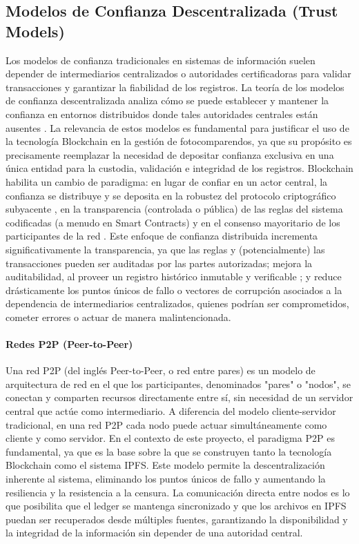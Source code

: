 \subsection{Modelos de Confianza Descentralizada (Trust Models)} 
Los modelos de confianza tradicionales en sistemas de información suelen depender de intermediarios centralizados o autoridades certificadoras para validar transacciones y garantizar la fiabilidad de los registros. La teoría de los modelos de confianza descentralizada analiza cómo se puede establecer y mantener la confianza en entornos distribuidos donde tales autoridades centrales están ausentes \parencite{swan2015blockchain}. La relevancia de estos modelos es fundamental para justificar el uso de la tecnología Blockchain en la gestión de fotocomparendos, ya que su propósito es precisamente reemplazar la necesidad de depositar confianza exclusiva en una única entidad para la custodia, validación e integridad de los registros. Blockchain habilita un cambio de paradigma: en lugar de confiar en un actor central, la confianza se distribuye y se deposita en la robustez del protocolo criptográfico subyacente \parencite{nakamoto2008bitcoin}, en la transparencia (controlada o pública) de las reglas del sistema codificadas (a menudo en Smart Contracts) y en el consenso mayoritario de los participantes de la red \parencite{antonopoulos2023mastering}. Este enfoque de confianza distribuida incrementa significativamente la transparencia, ya que las reglas y (potencialmente) las transacciones pueden ser auditadas por las partes autorizadas; mejora la auditabilidad, al proveer un registro histórico inmutable y verificable \parencite{swan2015blockchain}; y reduce drásticamente los puntos únicos de fallo o vectores de corrupción asociados a la dependencia de intermediarios centralizados, quienes podrían ser comprometidos, cometer errores o actuar de manera malintencionada. 

\paragraph{Redes P2P (Peer-to-Peer)} 
 Una red P2P (del inglés Peer-to-Peer, o red entre pares) es un modelo de arquitectura de red en el que los participantes, denominados "pares" o "nodos", se conectan y comparten recursos directamente entre sí, sin necesidad de un servidor central que actúe como intermediario. A diferencia del modelo cliente-servidor tradicional, en una red P2P cada nodo puede actuar simultáneamente como cliente y como servidor. 
En el contexto de este proyecto, el paradigma P2P es fundamental, ya que es la base sobre la que se construyen tanto la tecnología Blockchain como el sistema IPFS. Este modelo permite la descentralización inherente al sistema, eliminando los puntos únicos de fallo y aumentando la resiliencia y la resistencia a la censura. La comunicación directa entre nodos es lo que posibilita que el ledger se mantenga sincronizado y que los archivos en IPFS puedan ser recuperados desde múltiples fuentes, garantizando la disponibilidad y la integridad de la información sin depender de una autoridad central. 


